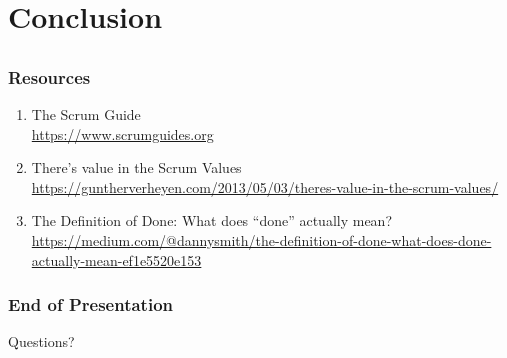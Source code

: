 \section{Conclusion}
\subsection{}

\begin{frame}
    \frametitle{Resources}
    \begin{enumerate}
        \setlength\itemsep{0.7em}
        \item The Scrum Guide \\
        \url{https://www.scrumguides.org}
        \item There's value in the Scrum Values \\
        \url{https://guntherverheyen.com/2013/05/03/theres-value-in-the-scrum-values/}
        \item The Definition of Done: What does ``done'' actually mean?\\
        \url{https://medium.com/@dannysmith/the-definition-of-done-what-does-done-actually-mean-ef1e5520e153}
    \end{enumerate}
\end{frame}

\begin{frame}
    \frametitle{End of Presentation}
    Questions?
\end{frame}